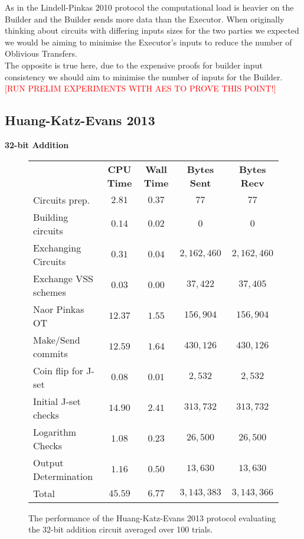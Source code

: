 \documentclass[ %
                    author={Nicholas Tutte},
                supervisor={Prof. Nigel Smart},
                    degree={MEng},
                     title={Secure Two Party Computation},
                  subtitle={A practical comparison of recent protocols},
                      type={Research - GG1K},
                      year={2015} ]{dissertation}
\begin{document}
					As in the Lindell-Pinkas 2010 protocol the computational load is heavier on the Builder and the Builder sends more data than the Executor. When originally thinking about circuits with differing inputs sizes for the two parties we expected we would be aiming to minimise the Executor's inputs to reduce the number of Oblivious Transfers.\\

					The opposite is true here, due to the expensive proofs for builder input consistency we should aim to minimise the number of inputs for the Builder. \textcolor{red}{[RUN PRELIM EXPERIMENTS WITH AES TO PROVE THIS POINT!]}\\


			\subsection{Huang-Katz-Evans 2013}

				\FloatBarrier
				\noindent \textbf{32-bit Addition}
				\begin{figure}[!ht]
					\begin{tabular}{| p{4.3cm} | c c c c |}
						\hline
						 & \textbf{CPU Time} & \textbf{Wall Time} & \textbf{Bytes Sent} & \textbf{Bytes Recv} \\
						\thickhline
						Circuits prep. & $2.81$ & $0.37$ & $77$ & $77$ \\
						\hline
						Building circuits & $0.14$ & $0.02$ & $0$ & $0$ \\
						\hline
						Exchanging Circuits & $0.31$ & $0.04$ & $2,162,460$ & $2,162,460$ \\
						\hline
						Exchange VSS schemes & $0.03$ & $0.00$ & $37,422$ & $37,405$ \\
						\hline
						Naor Pinkas OT & $12.37$ & $1.55$ & $156,904$ & $156,904$ \\
						\hline
						Make/Send commits & $12.59$ & $1.64$ & $430,126$ & $430,126$ \\
						\hline
						Coin flip for J-set & $0.08$ & $0.01$ & $2,532$ & $2,532$ \\
						\hline
						Initial J-set checks & $14.90$ & $2.41$ & $313,732$ & $313,732$ \\
						\hline
						Logarithm Checks & $1.08$ & $0.23$ & $26,500$ & $26,500$ \\
						\hline
						Output Determination & $1.16$ & $0.50$ & $13,630$ & $13,630$ \\
						\thickhline
						Total & $45.59$ & $6.77$ & $3,143,383$ & $3,143,366$ \\
						\hline
					\end{tabular}
					\caption{The performance of the Huang-Katz-Evans 2013 protocol evaluating the 32-bit addition circuit averaged over 100 trials.\label{table:HKE_2013_Add}}
				\end{figure}
\end{document}
